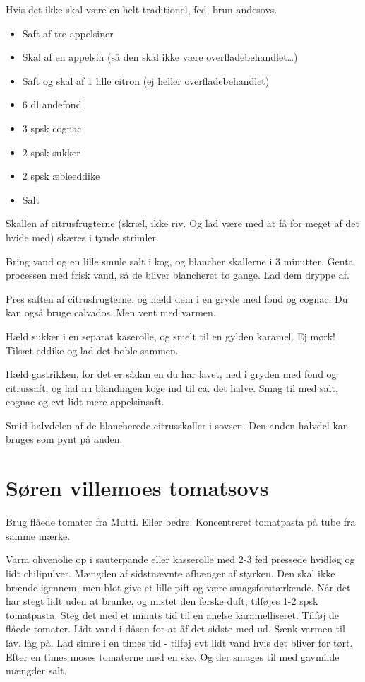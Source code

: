 \documentclass[
]{book}
\providecommand{\tightlist}{%
  \setlength{\itemsep}{0pt}\setlength{\parskip}{0pt}}
\begin{document}
Hvis det ikke skal være en helt traditionel, fed, brun andesovs.

\begin{itemize}
\tightlist
\item
  Saft af tre appelsiner
\item
  Skal af en appelsin (så den skal ikke være overfladebehandlet\ldots)
\item
  Saft og skal af 1 lille citron (ej heller overfladebehandlet)
\item
  6 dl andefond
\item
  3 spsk cognac
\item
  2 spsk sukker
\item
  2 spsk æbleeddike
\item
  Salt
\end{itemize}

Skallen af citrusfrugterne (skræl, ikke riv. Og lad være med at få for meget af det hvide med) skæres i tynde strimler.

Bring vand og en lille smule salt i kog, og blancher skallerne i 3 minutter. Genta processen med frisk vand, så de bliver blancheret to gange. Lad dem dryppe af.

Pres saften af citrusfrugterne, og hæld dem i en gryde med fond og cognac. Du kan også bruge calvados. Men vent med varmen.

Hæld sukker i en separat kaserolle, og smelt til en gylden karamel. Ej mørk! Tilsæt eddike og lad det boble sammen.

Hæld gastrikken, for det er sådan en du har lavet, ned i gryden med fond og citrussaft, og lad nu blandingen koge ind til ca. det halve. Smag til med salt, cognac og evt lidt mere appelsinsaft.

Smid halvdelen af de blancherede citrusskaller i sovsen. Den anden halvdel kan bruges som pynt på anden.

\hypertarget{suxf8ren-villemoes-tomatsovs}{%
\section{Søren villemoes tomatsovs}\label{suxf8ren-villemoes-tomatsovs}}

Brug flåede tomater fra Mutti. Eller bedre.
Koncentreret tomatpasta på tube fra samme mærke.

Varm olivenolie op i sauterpande eller kasserolle med 2-3 fed pressede hvidløg og
lidt chilipulver. Mængden af sidstnævnte afhænger af styrken. Den skal ikke
brænde igennem, men blot give et lille pift og være smagsforstærkende.
Når det har stegt lidt uden at branke, og mistet den ferske duft, tilføjes
1-2 spsk tomatpasta. Steg det med et minuts tid til en anelse karamelliseret.
Tilføj de flåede tomater. Lidt vand i dåsen for at åf det sidste med ud.
Sænk varmen til lav, låg på. Lad simre i en times tid - tilføj evt lidt
vand hvis det bliver for tørt. Efter en times moses tomaterne med en ske. Og
der smages til med gavmilde mængder salt.
\end{document}
